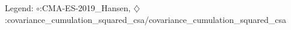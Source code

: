 Legend: {\color{CornflowerBlue}$\circ$}:CMA-ES-2019\_Hansen, {\color{Orange}$\diamondsuit$}:covariance\_cumulation\_squared\_csa/covariance\_cumulation\_squared\_csa